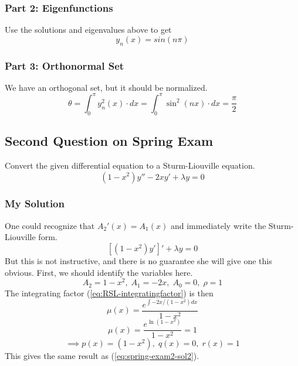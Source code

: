 \subsubsection{Part 2: Eigenfunctions}
Use the solutions and eigenvalues above to get
\begin{equation*}
    y_n(x) = sin(n\pi)
\end{equation*}


\subsubsection{Part 3: Orthonormal Set}
We have an orthogonal set, but it should be normalized.
\begin{equation*}
    \theta = \int_0^\pi y_n^2(x) \cdot dx = \int_0^\pi \sin^2(nx) \cdot dx = \frac{\pi}{2}
\end{equation*}


\subsection{Second Question on Spring Exam}
Convert the given differential equation to a Sturm-Liouville equation.
\begin{equation}
    (1-x^2)y'' - 2xy' + \lambda y = 0 
\end{equation}
\subsubsection{My Solution}
One could recognize that $A_2'(x)=A_1(x)$ and immediately write the Sturm-Liouville form.
\begin{equation} \label{eq:spring-exam2-sol2}
    [(1-x^2)y']' + \lambda y = 0
\end{equation}
But this is not instructive, and there is no guarantee she will give one this obvious. First, we should identify the variables here.
\begin{equation*}
    A_2 = 1-x^2,\; A_1 = -2x,\; A_0=0,\; \rho=1
\end{equation*}
The integrating factor (\ref{eq:RSL-integratingfactor}) is then
\begin{equation*}
    \mu(x) = \frac{e^{\int{-2x/(1-x^2)dx}}}{1-x^2}
\end{equation*}
\begin{equation*}
    \mu(x) = \frac{e^{\ln{(1-x^2)}}}{1-x^2} = 1
\end{equation*}
\begin{equation*}
    \implies p(x) = (1-x^2), \; q(x) = 0, \; r(x) = 1
\end{equation*}
This gives the same result as (\ref{eq:spring-exam2-sol2}).

